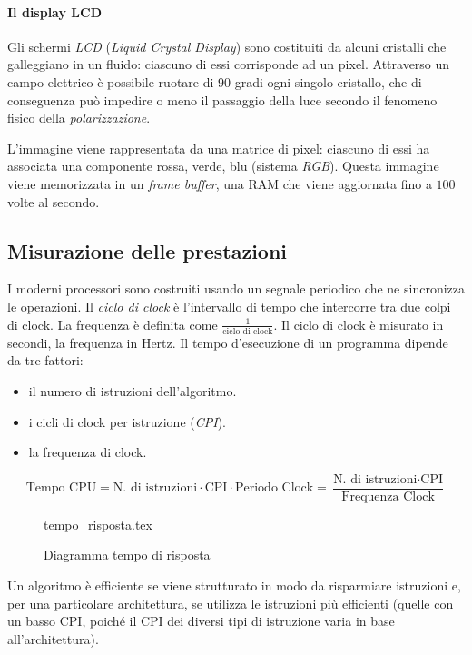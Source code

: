 \documentclass[class=book, crop=false, oneside]{standalone}
\begin{document}
\paragraph{Il display LCD}
Gli schermi \emph{LCD} (\emph{Liquid Crystal Display}) sono costituiti da alcuni cristalli che galleggiano in un fluido: ciascuno di essi corrisponde ad un pixel.
Attraverso un campo elettrico è possibile ruotare di 90 gradi ogni singolo cristallo, che di conseguenza può impedire o meno il passaggio della luce secondo il fenomeno fisico della \emph{polarizzazione}.

L'immagine viene rappresentata da una matrice di pixel: ciascuno di essi ha associata una componente rossa, verde, blu (sistema \emph{RGB}).
Questa immagine viene memorizzata in un \emph{frame buffer}, una RAM che viene aggiornata fino a \(100\) volte al secondo.

\subsection{Misurazione delle prestazioni}
I moderni processori sono costruiti usando un segnale periodico che ne sincronizza le operazioni.
Il \emph{ciclo di clock} è l'intervallo di tempo che intercorre tra due colpi di clock. La frequenza è definita come \(\frac{1}{\text{ciclo di clock}}\). Il ciclo di clock è misurato in secondi, la frequenza in Hertz. Il tempo d'esecuzione di un programma dipende da tre fattori:
\begin{itemize}[nolistsep]
	\item il numero di istruzioni dell'algoritmo.
	\item i cicli di clock per istruzione (\emph{CPI}).
	\item la frequenza di clock.
\end{itemize}

\begin{equation*}
\text{Tempo CPU} = \text{N. di istruzioni} \cdot \text{CPI} \cdot \text{Periodo Clock} = \frac{\text{N. di istruzioni} \cdot \text{CPI}}{\text{Frequenza Clock}}
\end{equation*}

\begin{figure}[H]
	\centering
	{tempo_risposta.tex}
	\caption{Diagramma tempo di risposta}
\end{figure}

Un algoritmo è efficiente se viene strutturato in modo da risparmiare istruzioni e, per una particolare architettura, se utilizza le istruzioni più efficienti (quelle con un basso CPI, poiché il CPI dei diversi tipi di istruzione varia in base all'architettura).
\end{document}
